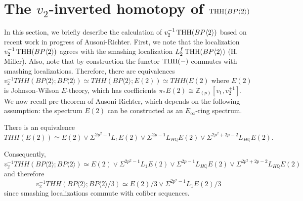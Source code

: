 
\section{The $v_2$-inverted homotopy of $\operatorname{THH}(BP\langle 2 \rangle)$}

In this section, we briefly describe the calculation of $v_2^{-1}\operatorname{THH}(BP\langle 2 \rangle)$ based on recent work in progress of Ausoni-Richter. First, we note that the localization $v_2^{-1}\operatorname{THH}(BP\langle 2 \rangle)$ agrees with the smashing localization $L^f_2\operatorname{THH}(BP\langle 2 \rangle)$ (H. Miller)\cite{qx}. Also, note that by construction the functor $\operatorname{THH}(-)$ commutes with smashing localizations. Therefore, there are equivalences
$v_2^{-1}THH(BP\langle 2\rangle ; BP\langle 2\rangle) \simeq THH(BP\langle 2\rangle; E(2)) \simeq THH(E(2) $
where $E(2)$ is Johnson-Wilson $E$-theory, which has coefficients $\pi_*E(2)\cong \mathbb{Z}_{(p)}[v_1,v_2^{\pm 1} ]$. We now recall pre-theorem of Ausoni-Richter, which depends on the following assumption: the spectrum $E(2)$ can be constructed as an $E_{\infty}$-ring spectrum. 
\begin{thm}
There is an equivalence 
\[ THH(E(2)) \simeq E(2) \vee \Sigma^{2p^2-1}L_1E(2) \vee \Sigma ^{2p-1}L_{H\mathbb{Q}}E(2) \vee \Sigma^{2p^2+2p-2} L_{H\mathbb{Q}}E(2). \]
\end{thm}

Consequently, 
\[v_2^{-1}THH(BP\langle 2\rangle ; BP\langle 2\rangle) \simeq E(2) \vee \Sigma ^{2p^2-1}L_1E(2) \vee \Sigma ^{2p-1}L_{H\mathbb{Q}}E(2) \vee \Sigma^{2p^2+2p-2} L_{H\mathbb{Q}}E(2)\] 
and therefore
\[v_2^{-1}THH(BP\langle 2\rangle ; BP\langle 2\rangle/3)\simeq E(2)/3 \vee \Sigma ^{2p^2-1}L_1E(2)/3 \]
since smashing localizations commute with cofiber sequences. 